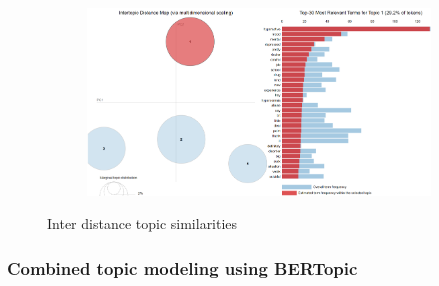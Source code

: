 \documentclass[sn-mathphys,Numbered]{sn-jnl}%
\theoremstyle{thmstyleone}%
\theoremstyle{thmstyletwo}%
\theoremstyle{thmstylethree}%
\begin{document}
\begin{figure}[h!]
\begin{subfigure}{0.45\textwidth}
    \label{redditdist}
\end{subfigure}
\hfill
\begin{subfigure}{0.45\textwidth}
    \includegraphics[width=\textwidth]{Attempt_pyldvis.png}
    \label{twitterdist}
\end{subfigure}   
\caption{Inter distance topic similarities}
\label{redditdist_twitterdist}
\end{figure}


\subsubsection{Combined topic modeling using BERTopic}
\end{document}
